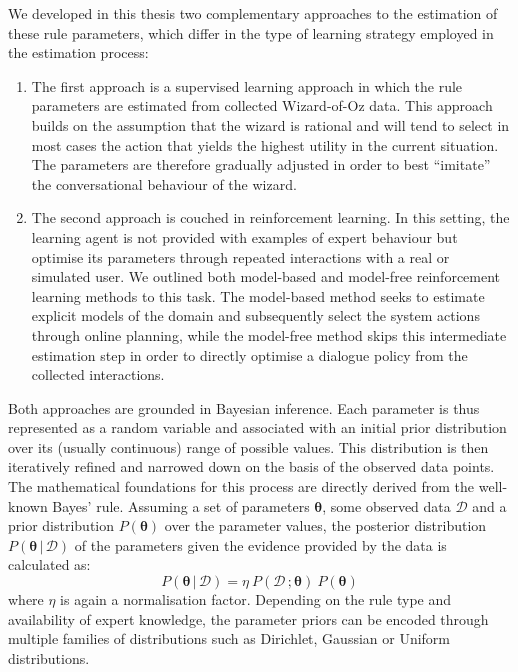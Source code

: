 We developed in this thesis two complementary approaches to the estimation of these rule parameters, which differ in the type of learning strategy employed in the estimation process:
\begin{enumerate}
\item The first approach is a supervised learning approach in which the rule parameters are estimated from collected Wizard-of-Oz data.  This approach builds on the assumption that the wizard is rational and will tend to select in most cases the action that yields the highest utility in the current situation. The parameters are therefore gradually adjusted in order to best ``imitate'' the conversational behaviour of the wizard.
\item The second approach is couched in reinforcement learning.  In this setting, the learning agent is not provided with examples of expert behaviour but optimise its parameters through repeated interactions with a real or simulated user. We outlined both model-based and model-free reinforcement learning methods to this task.  The model-based method seeks to estimate explicit models of the domain and subsequently select the system actions through online planning, while the model-free method skips this intermediate estimation step in order to directly optimise a dialogue policy from the collected interactions.
\end{enumerate}

Both approaches are grounded in Bayesian inference.  Each parameter is thus represented as a random variable and associated with an initial prior distribution over its (usually continuous) range of possible values. This distribution is then iteratively refined and narrowed down on the basis of the observed data points. The mathematical foundations for this process are directly derived from the well-known Bayes' rule. Assuming a set of parameters $\boldsymbol\theta$, some observed data $\mathcal{D}$ and a prior distribution $P(\boldsymbol\theta)$ over the parameter values, the posterior distribution $P(\boldsymbol\theta \, | \, \mathcal{D})$ of the parameters given the evidence provided by the data is calculated as:
\begin{equation}
P(\boldsymbol\theta \, | \, \mathcal{D}) = \eta \ P(\mathcal{D} \,; \boldsymbol\theta) \ P(\boldsymbol\theta)
\end{equation}
where $\eta$ is again a normalisation factor. Depending on the rule type and availability of expert knowledge, the parameter priors can be encoded through multiple families of distributions such as Dirichlet, Gaussian or Uniform distributions. 


